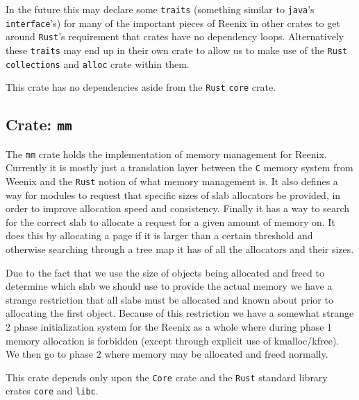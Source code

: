 \documentclass[12pt,letterpaper]{article}
\newcommand{\rust}{\texttt{Rust}}
\begin{document}
In the future this may declare some \texttt{traits} (something similar to
\texttt{java}'s \texttt{interface}'s) for many of the important pieces
of Reenix in other crates to get around \rust{}'s requirement that
crates have no dependency loops. Alternatively these \texttt{traits}
may end up in their own crate to allow us to make use of the \rust{}
\texttt{collections} and \texttt{alloc} crate within them.

This crate has no dependencies aside from the \rust{} \texttt{core} crate.

\subsection{Crate: \texttt{mm}}
The \texttt{mm} crate holds the implementation of memory management
for Reenix. Currently it is mostly just a translation layer between the
\texttt{C} memory system from Weenix and the \rust{} notion of what memory
management is. It also defines a way for modules to request that specific
sizes of slab allocators be provided, in order to improve allocation speed
and consistency. Finally it has a way to search for the correct slab
to allocate a request for a given amount of memory on. It does this by
allocating a page if it is larger than a certain threshold and otherwise
searching through a tree map it has of all the allocators and their sizes.

Due to the fact that we use the size of objects being allocated and freed
to determine which slab we should use to provide the actual memory we
have a strange restriction that all slabs must be allocated and known
about prior to allocating the first object. Because of this restriction
we have a somewhat strange 2 phase initialization system for the Reenix
as a whole where during phase 1 memory allocation is forbidden (except
through explicit use of kmalloc/kfree). We then go to phase 2 where
memory may be allocated and freed normally.

This crate depends only upon the \texttt{Core} crate and the \rust{}
standard library crates \texttt{core} and \texttt{libc}.
\end{document}
